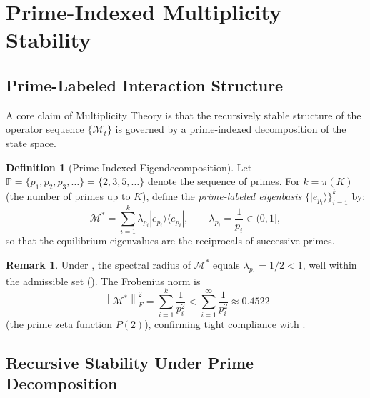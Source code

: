 \documentclass[12pt,letterpaper]{article}
\theoremstyle{plain}
\theoremstyle{definition}
\newtheorem{definition}[theorem]{Definition}
\newtheorem{remark}[theorem]{Remark}
\newcommand{\M}{\mathcal{M}}
\newcommand{\frnorm}[1]{\left\|#1\right\|_{F}}
\begin{document}
\section{Prime-Indexed Multiplicity Stability}
\label{app:prime}

\subsection{Prime-Labeled Interaction Structure}

A core claim of Multiplicity Theory is that the recursively stable
structure of the operator sequence \(\{\M_t\}\) is governed by a
prime-indexed decomposition of the state space.

\begin{definition}[Prime-Indexed Eigendecomposition]
\label{def:prime_decomp}
Let \(\mathbb{P} = \{p_1, p_2, p_3, \ldots\} = \{2, 3, 5, \ldots\}\) denote
the sequence of primes.  For \(k = \pi(K)\) (the number of primes up to
\(K\)), define the \emph{prime-labeled eigenbasis}
\(\{|e_{p_i}\rangle\}_{i=1}^k\) by:
\[
  \M^* = \sum_{i=1}^{k} \lambda_{p_i} |e_{p_i}\rangle\langle e_{p_i}|,
  \qquad
  \lambda_{p_i} = \frac{1}{p_i} \in (0,1],
\]
so that the equilibrium eigenvalues are the reciprocals of successive
primes.
\end{definition}

\begin{remark}
Under , the spectral radius of \(\M^*\) equals
\(\lambda_{p_1} = 1/2 < 1\), well within the admissible set
().
The Frobenius norm is
\[
  \frnorm{\M^*}^2 = \sum_{i=1}^k \frac{1}{p_i^2}
    < \sum_{i=1}^\infty \frac{1}{p_i^2} \approx 0.4522
\]
(the prime zeta function \(P(2)\)), confirming tight compliance with
.
\end{remark}

\subsection{Recursive Stability Under Prime Decomposition}
\end{document}
